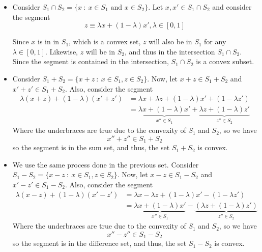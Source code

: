 \documentclass[11pt,table]{article}
\begin{document}
\begin{itemize}
	\item Consider \(S_{1} \cap S_{2}  =  \{x \ : \ x \in S_{1} \text{ and } x \in S_{2}\}\). Let \(x,x' \in S_1 \cap S_2\) and consider the segment
	      \[
		      z \equiv \lambda x + (1-\lambda)x', \lambda \in [0,1]
	      \]

	      Since \(x\) is in in \(S_1\), which is a convex set, \(z\) will also be in \(S_1\) for any \(\lambda \in [0,1]\). Likewise, \(z\) will be in \(S_2\), and thus in the intersection \(S_{1} \cap S_{2}\). Since the segment is contained in the intersection, \(S_{1} \cap S_{2}\) is a convex subset.

	\item Consider \(S_{1} + S_{2}  =  \{x + z \ : \ x \in S_{1}, z \in S_{2}\}\). Now, let \(x+z \in S_1 + S_2\) and \(x'+z' \in S_1+S_2\). Also, consider the segment
	      \begin{align*}
		      \lambda(x+z) + (1-\lambda)(x'+z') & = \lambda x + \lambda z + (1-\lambda)x' + (1-\lambda z')                                                     \\
		                                        & = \underbrace{\lambda x +(1-\lambda)x'}_{x'' \in S_1} + \underbrace{\lambda z + (1-\lambda)z'}_{z'' \in S_2}
	      \end{align*}
	      Where the underbraces are true due to the convexity of \(S_1\) and \(S_2\), so we have
	      \[
		      x'' + z'' \in S_1 + S_2
	      \]
	      so the segment is in the sum set, and thus, the set \(S_1 + S_2\) is convex.

	\item We use the same process done in the previous set. Consider \(S_{1} - S_{2}  =  \{x - z \ : \ x \in S_{1}, z \in S_{2}\}\). Now, let \(x-z \in S_1 - S_2\) and \(x'-z' \in S_1-S_2\). Also, consider the segment
	      \begin{align*}
		      \lambda(x-z) + (1-\lambda)(x'-z') & = \lambda x - \lambda z + (1-\lambda)x' - (1-\lambda z')                                                                   \\
		                                        & = \underbrace{\lambda x +(1-\lambda)x'}_{x'' \in S_1} - \underbrace{\left( \lambda z + (1-\lambda)z'\right)}_{z'' \in S_2}
	      \end{align*}
	      Where the underbraces are true due to the convexity of \(S_1\) and \(S_2\), so we have
	      \[
		      x'' - z'' \in S_1 - S_2
	      \]
	      so the segment is in the difference set, and thus, the set \(S_1 - S_2\) is convex.
\end{itemize}
\end{document}
